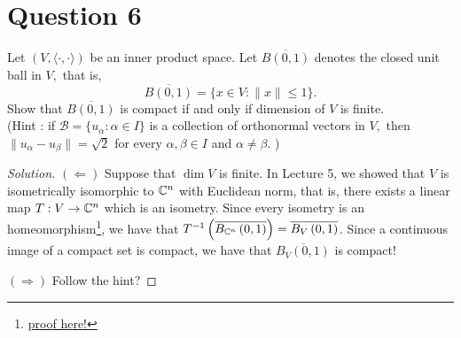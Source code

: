 \section{Question 6}
\horz
Let $(V,\langle \cdot, \cdot \rangle)$ be an inner product space. Let $\overline{B(0,1)}$ denotes the closed unit ball in $V,$ that is, $$\overline{B(0,1)} = \{x\in V : \|x\|\leqslant 1\}.$$ Show that $\overline{B(0,1)}$ is compact if and only if dimension of $V$ is finite. \\
(Hint : if $\mathcal B = \{u_{\alpha} : \alpha\in I\}$ is a collection of orthonormal vectors in $V,$ then $\|u_{\alpha}-u_{\beta}\|=\sqrt{2}$ for  every $\alpha,\beta\in I$ and $\alpha \neq \beta.$ )
\horz

\begin{proof}[Solution]
    $\left( \Longleftarrow \right)$ Suppose that $\dim V$ is finite. In Lecture 5, we showed that $V$ is isometrically isomorphic to $\mathbb C ^{n}$ with Euclidean norm, that is, there exists a linear map $T: V \to \mathbb C^{n}$ which is an isometry. 
    Since every isometry is an homeomorphism\footnote{\href{https://planetmath.org/isometry}{proof here!}}, we have that $T^{-1} \left( \overline{B_{\mathbb C^{n}}\left( 0,1 \right)} \right) = \overline{B_{V} \left( 0,1 \right)}$. Since a continuous image of a compact set is compact, we have that $\overline{B_{V}(0,1)}$ is compact!

    $\left( \Longrightarrow \right)$ Follow the hint?
\end{proof}
